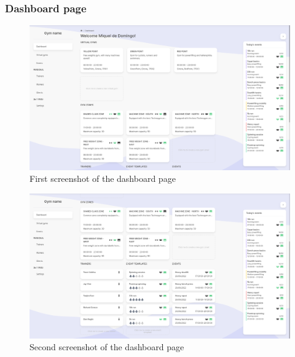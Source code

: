 \documentclass[a4paper, 12pt, oneside]{book}
\begin{document}
\subsubsection{Dashboard page}
\begin{figure}[H]
	\centering
	\includegraphics[width=\textwidth]{assets/core-screenshots/dashboard-one.png}
	\caption{First screenshot of the dashboard page}
\end{figure}
\begin{figure}[H]
	\centering
	\includegraphics[width=\textwidth]{assets/core-screenshots/dashboard-two.png}
	\caption{Second screenshot of the dashboard page}
\end{figure}
\end{document}
